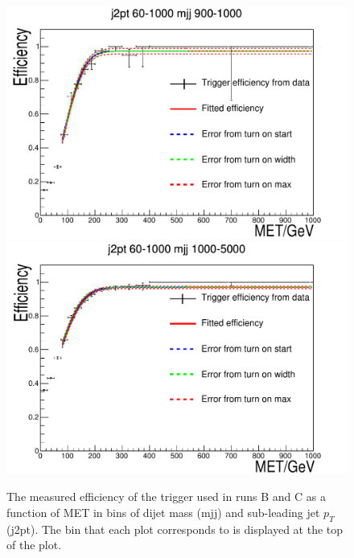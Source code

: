 \begin{figure}
\begin{center}
    \includegraphics[width=.6\largefigwidth]{plots/parked/trigfitplots/hData_MET_1D_44BC.pdf}
    \includegraphics[width=.6\largefigwidth]{plots/parked/trigfitplots/hData_MET_1D_45BC.pdf}
    \caption{The measured efficiency of the trigger used in runs B and C as a function of MET in bins of dijet mass (mjj) and sub-leading jet $p_{T}$ (j2pt). The bin that each plot corresponds to is displayed at the top of the plot.}
    \label{fig:trigfitplotsBC2}
  \end{center}
\end{figure}

